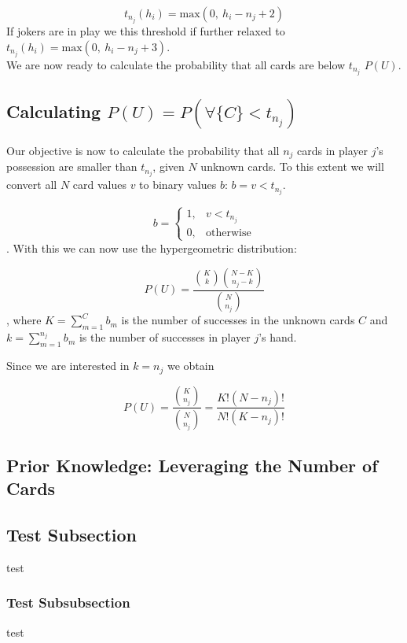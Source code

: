\documentclass[10pt]{article}
\begin{document}
\begin{equation*}
t_{n_j}(h_i) = \text{max}(0, \ h_i - n_j + 2)
\end{equation*}  
If jokers are in play we this threshold if further relaxed to  $t_{n_j}(h_i) = \text{max}(0,\  h_i - n_j + 3)$. 
\\
We are now ready to calculate the probability that all cards are below $t_{n_j}$ $P(U)$. 

\subsection{Calculating $P(U)=P(\forall \{C\} <  t_{n_j})$}
Our objective is now to calculate the probability that all $n_j$ cards in player $j$'s possession are smaller than $t_{n_j}$, 
given $N$ unknown cards. To this extent we will convert all $N$ card values $v$ to binary values $b$: $b= v < t_{n_j}$. 

\[
   b= 
\begin{cases}
    1,& v < t_{n_j}\\
    0,              & \text{otherwise}
\end{cases}
\].
With this we can now use the hypergeometric distribution:

\begin{equation*}
P(U) = \frac{  \binom{K}{k}  \binom{N-K}{n_{j} - k} }{  \binom{N}{n_j} }
\end{equation*}, 
where $K=\sum_{m=1}^{C}b_m$ is the number of successes in the unknown cards $C$ and $k=\sum_{m=1}^{n_j}b_m$ is the number of successes in player $j$'s hand. 

Since we are interested in $k=n_j$ we obtain

\begin{equation*}
P(U) = \frac{  \binom{K}{n_j}  }{  \binom{N}{n_j} } = \frac{K! \left(N-n_j \right)! }{N!\left(K-n_j \right)!}
\end{equation*} 



\subsection{Prior Knowledge: Leveraging the Number of Cards}


\subsection{Test Subsection}
test
\subsubsection{Test Subsubsection}
test
\end{document}
